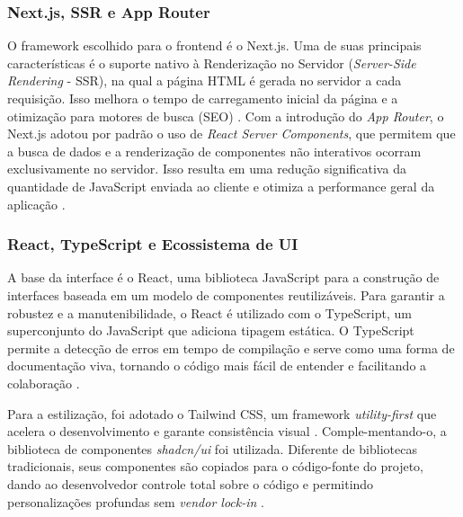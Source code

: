 \subsubsection{Next.js, SSR e App Router}
O framework escolhido para o frontend é o Next.js. Uma de suas principais características é o suporte nativo à Renderização no Servidor (\textit{Server-Side Rendering} - SSR), na qual a página HTML é gerada no servidor a cada requisição. Isso melhora o tempo de carregamento inicial da página e a otimização para motores de busca (SEO) \cite{medium2025ssr}. Com a introdução do \textit{App Router}, o Next.js adotou por padrão o uso de \textit{React Server Components}, que permitem que a busca de dados e a renderização de componentes não interativos ocorram exclusivamente no servidor. Isso resulta em uma redução significativa da quantidade de JavaScript enviada ao cliente e otimiza a performance geral da aplicação \cite{nextjs2025servercomponents}.

\subsubsection{React, TypeScript e Ecossistema de UI}
A base da interface é o React, uma biblioteca JavaScript para a construção de interfaces baseada em um modelo de componentes reutilizáveis. Para garantir a robustez e a manutenibilidade, o React é utilizado com o TypeScript, um superconjunto do JavaScript que adiciona tipagem estática. O TypeScript permite a detecção de erros em tempo de compilação e serve como uma forma de documentação viva, tornando o código mais fácil de entender e facilitando a colaboração \cite{dhiwise2024reacttypescript}.

Para a estilização, foi adotado o Tailwind CSS, um framework \textit{utility-first} que acelera o desenvolvimento e garante consistência visual \cite{medium2025cssframeworks}. Comple-mentando-o, a biblioteca de componentes \textit{shadcn/ui} foi utilizada. Diferente de bibliotecas tradicionais, seus componentes são copiados para o código-fonte do projeto, dando ao desenvolvedor controle total sobre o código e permitindo personalizações profundas sem \textit{vendor lock-in} \cite{shadcnui2025docs}.


